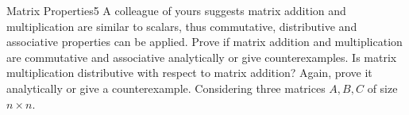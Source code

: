 \newif\ifvimbug
\vimbugfalse

\ifvimbug

\fi

 

\begin{questions}


\begin{question}{Matrix Properties}{5}
A colleague of yours suggests matrix addition and multiplication are similar to scalars, thus commutative, distributive and associative properties can be applied.
Prove if matrix addition and multiplication are commutative and associative analytically or give counterexamples. 
Is matrix multiplication distributive with respect to matrix addition? 
Again, prove it analytically or give a counterexample.
Considering three matrices $ A, B, C$ of size $n\times n$.


\end{question}
\end{questions}
